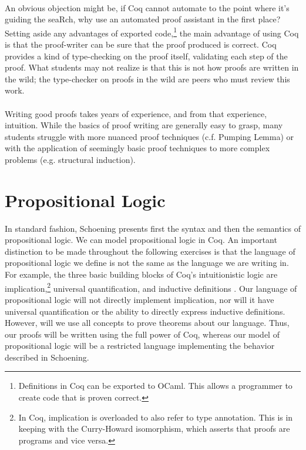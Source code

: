 \documentclass{article}
\begin{document}
\paragraph{}
An obvious objection might be, if Coq cannot automate to the point where it's guiding the seaRch, why use an automated proof assistant in the first place? Setting aside any advantages of exported code,\footnote{Definitions in Coq can be exported to OCaml. This allows a programmer to create code that is proven correct.} the main advantage of using Coq is that the proof-writer can be sure that the proof produced is correct. Coq provides a kind of type-checking on the proof itself, validating each step of the proof. What students may not realize is that this is not how proofs are written in the wild; the type-checker on proofs in the wild are peers who must review this work. 

\paragraph{}
Writing good proofs takes years of experience, and from that experience, intuition. While the basics of proof writing are generally easy to grasp, many students struggle with more nuanced proof techniques (c.f. Pumping Lemma) or with the application of seemingly basic proof techniques to more complex problems (e.g. structural induction). 

\section{Propositional Logic}

In standard fashion, Schoening presents first the syntax and then the semantics of propositional logic. We can model propositional logic in Coq. An important distinction to be made throughout the following exercises is that the language of propositional logic we define is not the same as the language we are writing in. For example, the three basic building blocks of Coq's intuitionistic logic are implication,\footnote{In Coq, implication is overloaded to also refer to type annotation. This is in keeping with the Curry-Howard isomorphism, which asserts that proofs are programs and vice versa.} universal quantification, and inductive definitions \cite{Pierce:SF}. Our language of propositional logic will not directly implement implication, nor will it have universal quantification or the ability to directly express inductive definitions. However, will we use all concepts to prove theorems about our language. Thus, our proofs will be written using the full power of Coq, whereas our model of propositional logic will be a restricted language implementing the behavior described in Schoening.
\end{document}
